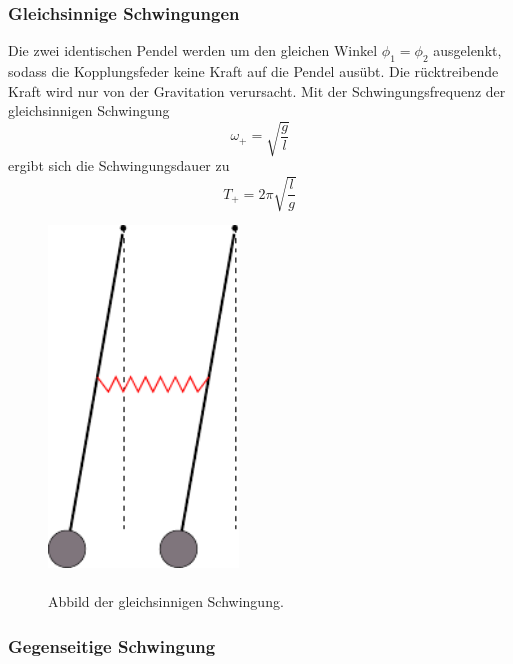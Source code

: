 \subsubsection{Gleichsinnige Schwingungen}
\label{subsec:Gleich}
\begin{minipage}[t]{0.5\textwidth}
Die zwei identischen Pendel werden um den gleichen Winkel $\phi_1 = \phi_2$ ausgelenkt, sodass die Kopplungsfeder keine Kraft auf die Pendel ausübt.
Die rücktreibende Kraft wird nur von der Gravitation verursacht.
Mit der Schwingungsfrequenz der gleichsinnigen Schwingung
\begin{equation}
    \omega_+ = \sqrt{\frac{g}{l}}
    \label{eqn:omega+}
\end{equation}
ergibt sich die Schwingungsdauer zu
\begin{equation}
    T_+ = 2 \pi \sqrt{\frac{l}{g}}
    \label{eqn:T+}
\end{equation}
\end{minipage}
\begin{minipage}[t]{0.5\textwidth}
    \begin{figure}[H]
        \centering
        \includegraphics[width=0.45\textwidth]{build/Abb_1.pdf}
\caption{\\Abbild der gleichsinnigen Schwingung. \cite{V106}}
        \label{fig:gleich}
      \end{figure}
\end{minipage}
\subsubsection{Gegenseitige Schwingung}

